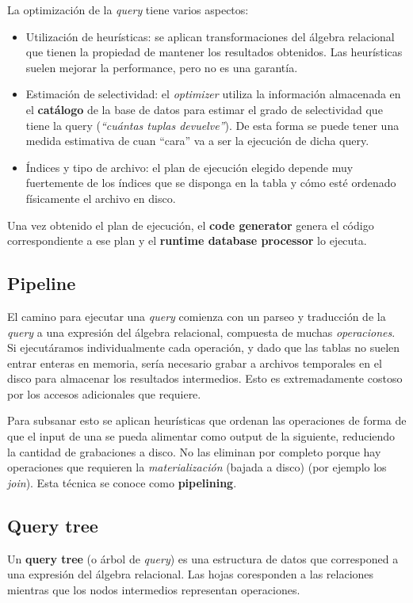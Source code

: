 \documentclass[]{article}
\begin{document}
La optimización de la \emph{query} tiene varios aspectos:
\begin{itemize}
    \item Utilización de heurísticas: se aplican transformaciones del álgebra relacional que tienen la propiedad de mantener los resultados obtenidos. Las heurísticas suelen mejorar la performance, pero no es una garantía.
    \item Estimación de selectividad: el \emph{optimizer} utiliza la información almacenada en el \textbf{catálogo} de la base de datos para estimar el grado de selectividad que tiene la query (\emph{``cuántas tuplas devuelve''}). De esta forma se puede tener una medida estimativa de cuan ``cara'' va a ser la ejecución de dicha query.
    \item Índices y tipo de archivo: el plan de ejecución elegido depende muy fuertemente de los índices que se disponga en la tabla y cómo esté ordenado físicamente el archivo en disco.
\end{itemize}

Una vez obtenido el plan de ejecución, el \textbf{code generator} genera el código correspondiente a ese plan y el \textbf{runtime database processor} lo ejecuta.


\subsection{Pipeline}
El camino para ejecutar una \emph{query} comienza con un parseo y traducción de la \emph{query} a una expresión del álgebra relacional, compuesta de muchas \emph{operaciones}. Si ejecutáramos individualmente cada operación, y dado que las tablas no suelen entrar enteras en memoria, sería necesario grabar a archivos temporales en el disco para almacenar los resultados intermedios. Esto es extremadamente costoso por los accesos adicionales que requiere.

Para subsanar esto se aplican heurísticas que ordenan las operaciones de forma de que el input de una se pueda alimentar como output de la siguiente, reduciendo la cantidad de grabaciones a disco. No las eliminan por completo porque hay operaciones que requieren la \emph{materialización} (bajada a disco) (por ejemplo los \emph{join}). Esta técnica se conoce como \textbf{pipelining}.

\subsection{Query tree}
Un \textbf{query tree} (o árbol de \emph{query}) es una estructura de datos que corresponed a una expresión del álgebra relacional. Las hojas coresponden a las relaciones mientras que los nodos intermedios representan operaciones.
\end{document}
